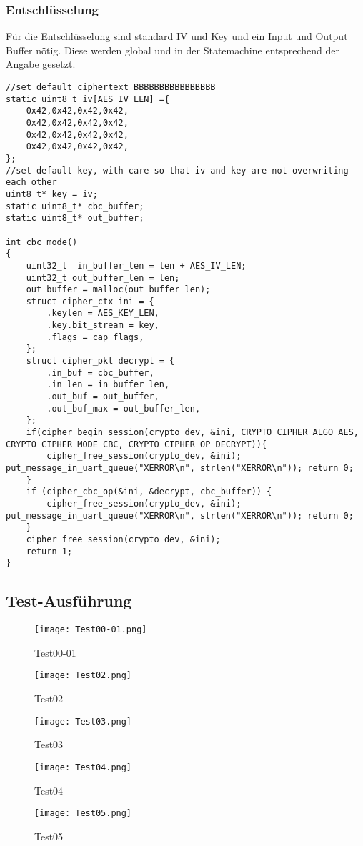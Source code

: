 \subsubsection{Entschlüsselung}
Für die Entschlüsselung sind standard IV und Key und ein Input und Output Buffer nötig. Diese werden global und in der Statemachine entsprechend der Angabe gesetzt. 
\begin{lstlisting}[style=StyleC, captionpos=b, caption=UART-Initialisierung, label=UART-Initialisierung]
//set default ciphertext BBBBBBBBBBBBBBBB
static uint8_t iv[AES_IV_LEN] ={
    0x42,0x42,0x42,0x42,
    0x42,0x42,0x42,0x42,
    0x42,0x42,0x42,0x42,
    0x42,0x42,0x42,0x42,
};
//set default key, with care so that iv and key are not overwriting each other
uint8_t* key = iv;
static uint8_t* cbc_buffer;
static uint8_t* out_buffer;    

int cbc_mode()
{	
	uint32_t  in_buffer_len = len + AES_IV_LEN; 
	uint32_t out_buffer_len = len; 
	out_buffer = malloc(out_buffer_len);
	struct cipher_ctx ini = {
		.keylen = AES_KEY_LEN,
		.key.bit_stream = key,
		.flags = cap_flags,
	};
	struct cipher_pkt decrypt = {
		.in_buf = cbc_buffer,
		.in_len = in_buffer_len,
		.out_buf = out_buffer,
		.out_buf_max = out_buffer_len,
	};
	if(cipher_begin_session(crypto_dev, &ini, CRYPTO_CIPHER_ALGO_AES, CRYPTO_CIPHER_MODE_CBC, CRYPTO_CIPHER_OP_DECRYPT)){
		cipher_free_session(crypto_dev, &ini); put_message_in_uart_queue("XERROR\n", strlen("XERROR\n")); return 0;
	} 
	if (cipher_cbc_op(&ini, &decrypt, cbc_buffer)) {
		cipher_free_session(crypto_dev, &ini); put_message_in_uart_queue("XERROR\n", strlen("XERROR\n")); return 0;
	}
	cipher_free_session(crypto_dev, &ini);
	return 1;
}
\end{lstlisting}


\newpage
\subsection{Test-Ausführung}
\begin{figure}[!htb]
    \centering
    \texttt{[image: Test00-01.png]}
    \caption{Test00-01}
    \label{caption:Test00-01}
\end{figure}
\begin{figure}[!htb]
    \centering
    \texttt{[image: Test02.png]}
    \caption{Test02}
    \label{caption:Test02}
\end{figure}
\begin{figure}[!htb]
    \centering
    \texttt{[image: Test03.png]}
    \caption{Test03}
    \label{caption:Test03}
\end{figure}
\begin{figure}[!htb]
    \centering
    \texttt{[image: Test04.png]}
    \caption{Test04}
    \label{caption:Test04}
\end{figure}
\begin{figure}[!htb]
    \centering
    \texttt{[image: Test05.png]}
    \caption{Test05}
    \label{caption:Test05}
\end{figure}
